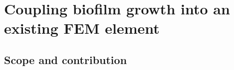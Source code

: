 %
%
%
%
\providecommand{\ansysfigdir}{../assets/}

\providecommand{\TierA}[1]{\marginpar{\footnotesize A}#1}   %
\providecommand{\TierB}[1]{\marginpar{\footnotesize B}{\color{gray}#1}} %

\chapter{Coupling biofilm growth into an existing FEM element}
\label{ch:ansys}

\section{Scope and contribution}
\label{sec:ch5-scope}

